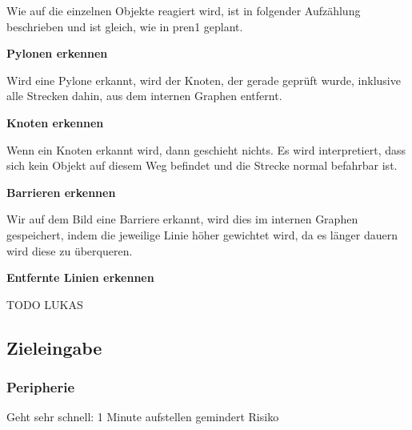 Wie auf die einzelnen Objekte reagiert wird, ist in folgender Aufzählung beschrieben und ist gleich, wie in \acrshort{pren1} geplant.

\textbf{Pylonen erkennen}

Wird eine Pylone erkannt, wird der Knoten, der gerade geprüft wurde, inklusive alle Strecken dahin, aus dem internen Graphen entfernt.

\textbf{Knoten erkennen}

Wenn ein Knoten erkannt wird, dann geschieht nichts. Es wird interpretiert, dass sich kein Objekt auf diesem Weg befindet und die Strecke normal befahrbar ist.

\textbf{Barrieren erkennen}

Wir auf dem Bild eine Barriere erkannt, wird dies im internen Graphen gespeichert, indem die jeweilige Linie höher gewichtet wird, da es länger dauern wird diese zu überqueren.

\textbf{Entfernte Linien erkennen}

TODO LUKAS

\newpage
\subsection{Zieleingabe}

\subsubsection{Peripherie}
\label{zieleingabe}

Geht sehr schnell: 1 Minute aufstellen gemindert Risiko